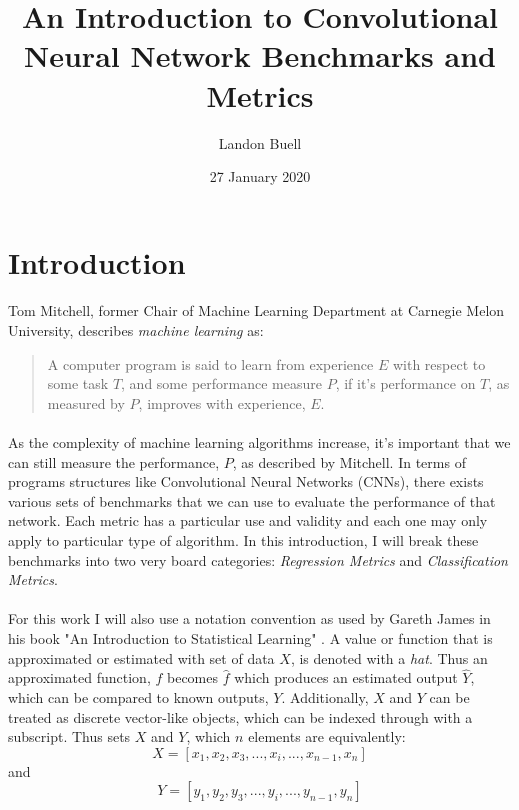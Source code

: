 \documentclass[12pt,letterpaper]{article}
\begin{document}

\title{An Introduction to Convolutional Neural Network Benchmarks and Metrics}
\author{Landon Buell}
\date{27 January 2020}
\maketitle


\section{Introduction}
\paragraph*{}Tom Mitchell, former Chair of Machine Learning Department at Carnegie Melon University, describes \textit{machine learning} as:
\begin{quote}
A computer program is said to learn from experience $E$ with respect to some task $T$, and some performance measure $P$, if it's performance on $T$, as measured by $P$, improves with experience, $E$. \cite{Geron}
\end{quote}
\paragraph*{}As the complexity of machine learning algorithms increase, it's important that we can still measure the performance, $P$, as described by Mitchell. In terms of programs structures like Convolutional Neural Networks (CNNs), there exists various sets of benchmarks that we can use to evaluate the performance of that network. Each metric has a particular use and validity and each one may only apply to particular type of algorithm. In this introduction, I will break these benchmarks into two very board categories: \textit{Regression Metrics} and \textit{Classification Metrics}.
\paragraph*{}For this work I will also use a notation convention as used by Gareth James in his book "An Introduction to Statistical Learning" \cite{James}. A value or function that is approximated or estimated with  set of data $X$, is denoted with a \textit{hat}. Thus an approximated function, $f$ becomes $\hat{f}$ which produces an estimated output $\hat{Y}$, which can be compared to known outputs, $Y$. Additionally, $X$ and $Y$ can be treated as discrete vector-like objects, which can be indexed through with a subscript. Thus sets $X$ and $Y$, which $n$ elements are equivalently:
\begin{equation}
X = [x_1, x_2 , x_3 , ... , x_i , ... , x_{n-1} , x_n]
\end{equation}
and
\begin{equation}
Y = [y_1, y_2 , y_3 , ... , y_i , ... , y_{n-1} , y_n]
\end{equation}
\end{document}
